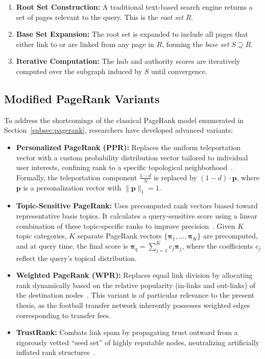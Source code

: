 \begin{enumerate}
    \item \textbf{Root Set Construction:} A traditional text-based search engine returns a set of pages relevant to the query. This is the \textit{root set} $R$.
    \item \textbf{Base Set Expansion:} The root set is expanded to include all pages that either link to or are linked from any page in $R$, forming the \textit{base set} $S \supseteq R$.
    \item \textbf{Iterative Computation:} The hub and authority scores are iteratively computed over the subgraph induced by $S$ until convergence.
\end{enumerate}


\subsection{Modified PageRank Variants}
\label{subsec:pagerank_variants}

To address the shortcomings of the classical PageRank model enumerated in Section~\ref{subsec:pagerank}, researchers have developed advanced variants:

\begin{itemize}
    \item \textbf{Personalized PageRank (PPR):} Replaces the uniform teleportation vector with a custom probability distribution vector tailored to individual user interests, confining rank to a specific topological neighborhood~\cite{personalized_pagerank}. Formally, the teleportation component $\frac{1-d}{N}$ is replaced by $(1-d) \cdot \mathbf{p}$, where $\mathbf{p}$ is a personalization vector with $\|\mathbf{p}\|_1 = 1$.

    \item \textbf{Topic-Sensitive PageRank:} Uses precomputed rank vectors biased toward representative basis topics. It calculates a query-sensitive score using a linear combination of these topic-specific ranks to improve precision~\cite{topic_sensitive_pagerank}. Given $K$ topic categories, $K$ separate PageRank vectors $\{\boldsymbol{\pi}_1, \dots, \boldsymbol{\pi}_K\}$ are precomputed, and at query time, the final score is $\boldsymbol{\pi}_q = \sum_{j=1}^{K} c_j \boldsymbol{\pi}_j$, where the coefficients $c_j$ reflect the query's topical distribution.

    \item \textbf{Weighted PageRank (WPR):} Replaces equal link division by allocating rank dynamically based on the relative popularity (in-links and out-links) of the destination nodes~\cite{weighted_pagerank_geeks, weighted_pagerank_trec}. This variant is of particular relevance to the present thesis, as the football transfer network inherently possesses weighted edges corresponding to transfer fees.

    \item \textbf{TrustRank:} Combats link spam by propagating trust outward from a rigorously vetted ``seed set'' of highly reputable nodes, neutralizing artificially inflated rank structures~\cite{trustrank2004}.
\end{itemize}


